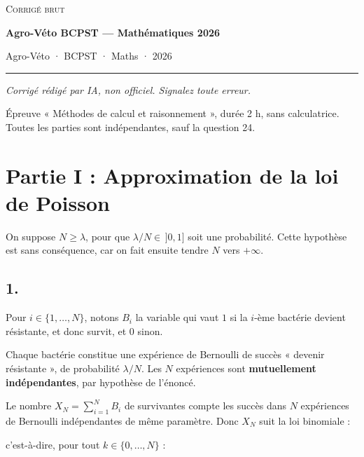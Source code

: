\documentclass[11pt,a4paper]{article}
\newcommand{\equationajustee}[1]{%
  \sbox{\boiteequation}{$\displaystyle #1$}%
  \ifdim\wd\boiteequation>\linewidth
    \[\resizebox{\linewidth}{!}{\usebox{\boiteequation}}\]%
  \else
    \[#1\]%
  \fi}
\begin{document}
\thispagestyle{plain}
\begin{center}
  {\small\scshape Corrigé brut}\par\smallskip
  {\LARGE\bfseries Agro-Véto BCPST — Mathématiques 2026\par}\medskip
  {\large Agro-Véto · BCPST · Maths · 2026\par}
\end{center}
\vspace{2pt}\hrule\vspace{8pt}

\emph{Corrigé rédigé par IA, non officiel. Signalez toute erreur.}

Épreuve « Méthodes de calcul et raisonnement », durée 2 h, sans calculatrice. Toutes les parties sont indépendantes, sauf la question 24.

\hypertarget{partie-i-approximation-de-la-loi-de-poisson}{%
\section{Partie I : Approximation de la loi de Poisson}\label{partie-i-approximation-de-la-loi-de-poisson}}

On suppose \(N\ge\lambda\), pour que \(\lambda/N\in\,]0,1]\) soit une probabilité. Cette hypothèse est sans conséquence, car on fait ensuite tendre \(N\) vers \(+\infty\).

\hypertarget{section}{%
\subsection{1.}\label{section}}

Pour \(i\in\{1,\dots,N\}\), notons \(B_i\) la variable qui vaut \(1\) si la \(i\)-ème bactérie devient résistante, et donc survit, et \(0\) sinon.

Chaque bactérie constitue une expérience de Bernoulli de succès « devenir résistante », de probabilité \(\lambda/N\). Les \(N\) expériences sont \textbf{mutuellement indépendantes}, par hypothèse de l'énoncé.

Le nombre \(X_N=\sum_{i=1}^N B_i\) de survivantes compte les succès dans \(N\) expériences de Bernoulli indépendantes de même paramètre. Donc \(X_N\) suit la loi binomiale :

\equationajustee{\boxed{X_N\sim\mathcal B\!\left(N,\tfrac{\lambda}{N}\right)}}

c'est-à-dire, pour tout \(k\in\{0,\dots,N\}\) :

\equationajustee{\boxed{\mathbb P(X_N=k)=\binom Nk\left(\frac\lambda N\right)^k\left(1-\frac\lambda N\right)^{N-k}.}}
\end{document}
